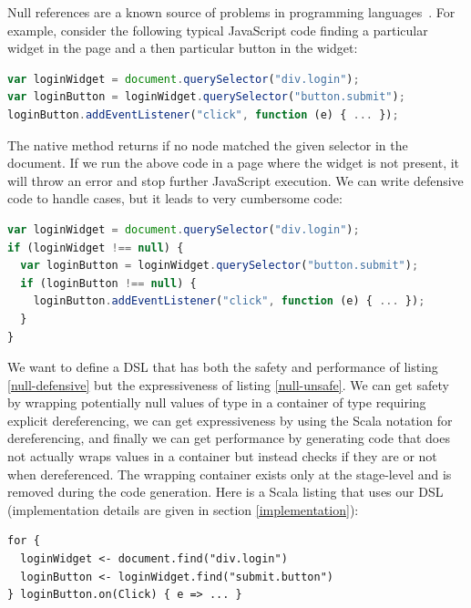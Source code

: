 \documentclass[american,english,runningheads]{llncs}
\begin{document}
Null references are a known source of problems in programming languages~\cite{Hoare09_Null,Nanda09_Null}. For
example, consider the following typical JavaScript code finding a particular widget in the page and a then particular
button in the widget:

\begin{lstlisting}[language=JavaScript,label=null-unsafe,caption=Unsafe code]
var loginWidget = document.querySelector("div.login");
var loginButton = loginWidget.querySelector("button.submit");
loginButton.addEventListener("click", function (e) { ... });
\end{lstlisting}

The native  method returns  if no node matched the given selector in the document. If
we run the above code in a page where the widget is not present, it will throw an error and stop further JavaScript
execution. We can write defensive code to handle  cases, but it leads to very cumbersome code:

\begin{lstlisting}[language=JavaScript,label=null-defensive,caption=Defensive programming to handle null references]
var loginWidget = document.querySelector("div.login");
if (loginWidget !== null) {
  var loginButton = loginWidget.querySelector("button.submit");
  if (loginButton !== null) {
    loginButton.addEventListener("click", function (e) { ... });
  }
}
\end{lstlisting}

We want to define a DSL that has both the safety and performance of listing \ref{null-defensive} but the
expressiveness of listing \ref{null-unsafe}. We can get safety by wrapping potentially null values of type
 in a container of type  requiring explicit dereferencing, we can get
expressiveness by using the Scala  notation for dereferencing, and finally we can get performance by
generating code that does not actually wraps values in a container but instead checks if they are  or not
when dereferenced. The wrapping container exists only at the stage-level and is removed during the code generation.
Here is a Scala listing that uses our DSL (implementation details are given in section \ref{implementation}):

\begin{lstlisting}
for {
  loginWidget <- document.find("div.login")
  loginButton <- loginWidget.find("submit.button")
} loginButton.on(Click) { e => ... }
\end{lstlisting}
\end{document}
